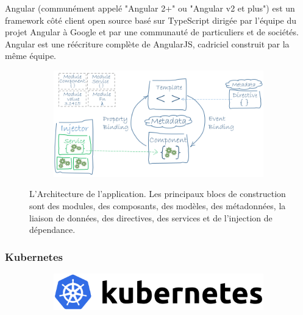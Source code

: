 \documentclass{article}
\begin{document}
Angular (communément appelé "Angular 2+" ou "Angular v2 et plus") est un framework côté client open source basé sur TypeScript dirigée par l'équipe du projet Angular à Google et par une communauté de particuliers et de sociétés. Angular est une réécriture complète de AngularJS, cadriciel construit par la même équipe. 

\begin{figure}[h!]
	\centering
	\begin{subfigure}[b]{0.9\linewidth}
  \includegraphics[width=\linewidth]{Angularf.png}
	\end{subfigure}
	\caption{L'Architecture de l'application. Les principaux blocs de construction sont des modules, des composants, des modèles, des métadonnées, la liaison de données, des directives, des services et de l'injection de dépendance.}
\end{figure}
\newpage
\subsubsection{Kubernetes}

\begin{figure}[h!]
	\centering
  	\begin{subfigure}[b]{0.4\linewidth}
    \includegraphics[width=\linewidth]{kube.png}
  	\end{subfigure}
\end{figure}
\end{document}
